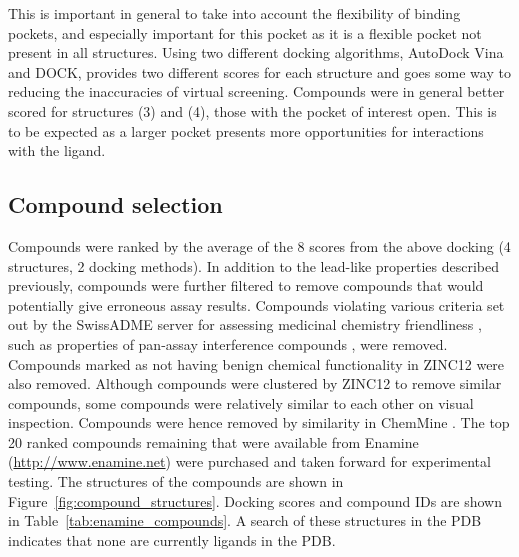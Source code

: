 This is important in general to take into account the flexibility of binding pockets, and especially important for this pocket as it is a flexible pocket not present in all structures.
Using two different docking algorithms, AutoDock Vina and DOCK, provides two different scores for each structure and goes some way to reducing the inaccuracies of virtual screening.
Compounds were in general better scored for structures (3) and (4), those with the pocket of interest open.
This is to be expected as a larger pocket presents more opportunities for interactions with the ligand.


\subsection{Compound selection}

Compounds were ranked by the average of the 8 scores from the above docking (4 structures, 2 docking methods).
In addition to the lead-like properties described previously, compounds were further filtered to remove compounds that would potentially give erroneous assay results.
Compounds violating various criteria set out by the SwissADME server for assessing medicinal chemistry friendliness \cite{Daina2017}, such as properties of pan-assay interference compounds \cite{Baell2014}, were removed.
Compounds marked as not having benign chemical functionality in ZINC12 were also removed.
Although compounds were clustered by ZINC12 to remove similar compounds, some compounds were relatively similar to each other on visual inspection.
Compounds were hence removed by similarity in ChemMine \cite{Backman2011}.
The top 20 ranked compounds remaining that were available from Enamine (\url{http://www.enamine.net}) were purchased and taken forward for experimental testing.
The structures of the compounds are shown in Figure~\ref{fig:compound_structures}.
Docking scores and compound IDs are shown in Table~\ref{tab:enamine_compounds}.
A search of these structures in the PDB indicates that none are currently ligands in the PDB.


